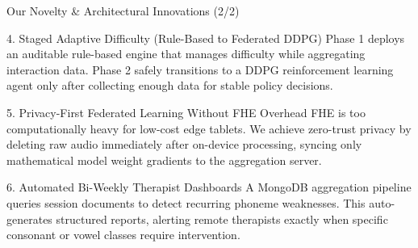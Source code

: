 \documentclass[aspectratio=169, 11pt, xcolor=table]{beamer}
\begin{document}
\begin{frame}{Our Novelty \& Architectural Innovations (2/2)}
    \vspace{-2mm}
    \begin{block}{\small 4. Staged Adaptive Difficulty (Rule-Based to Federated DDPG)}
        \footnotesize
        Phase 1 deploys an auditable rule-based engine that manages difficulty while aggregating interaction data. Phase 2 safely transitions to a DDPG reinforcement learning agent only after collecting enough data for stable policy decisions.
    \end{block}
    \vspace{2mm}
    
    \begin{block}{\small 5. Privacy-First Federated Learning Without FHE Overhead}
        \footnotesize
        FHE is too computationally heavy for low-cost edge tablets. We achieve zero-trust privacy by deleting raw audio immediately after on-device processing, syncing only mathematical model weight gradients to the aggregation server.
    \end{block}
    \vspace{2mm}

    \begin{block}{\small 6. Automated Bi-Weekly Therapist Dashboards}
        \footnotesize
        A MongoDB aggregation pipeline queries session documents to detect recurring phoneme weaknesses. This auto-generates structured reports, alerting remote therapists exactly when specific consonant or vowel classes require intervention.
    \end{block}
\end{frame}

\end{document}
